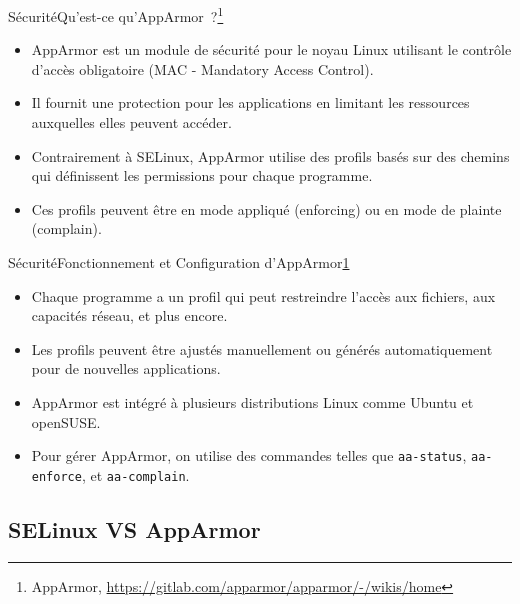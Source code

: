 \documentclass{beamer}
\begin{document}
    \begin{frame}{Sécurité}{Qu'est-ce qu'AppArmor~?\footnote{\label{apparmor}AppArmor, \url{https://gitlab.com/apparmor/apparmor/-/wikis/home}}}
        \begin{itemize}
            \item AppArmor est un module de sécurité pour le noyau Linux utilisant le contrôle d'accès obligatoire (MAC - Mandatory Access Control).
            \item Il fournit une protection pour les applications en limitant les ressources auxquelles elles peuvent accéder.
            \item Contrairement à SELinux, AppArmor utilise des profils basés sur des chemins qui définissent les permissions pour chaque programme.
            \item Ces profils peuvent être en mode appliqué (enforcing) ou en mode de plainte (complain).
        \end{itemize}
    \end{frame}

    \begin{frame}{Sécurité}{Fonctionnement et Configuration d'AppArmor\cref{apparmor}}
        \begin{itemize}
            \item Chaque programme a un profil qui peut restreindre l'accès aux fichiers, aux capacités réseau, et plus encore.
            \item Les profils peuvent être ajustés manuellement ou générés automatiquement pour de nouvelles applications.
            \item AppArmor est intégré à plusieurs distributions Linux comme Ubuntu et openSUSE.
            \item Pour gérer AppArmor, on utilise des commandes telles que \lstinline{aa-status}, \lstinline{aa-enforce}, et \lstinline{aa-complain}.
        \end{itemize}
    \end{frame}

    \subsection{SELinux VS AppArmor}\label{subsec:selinux-vs-apparmor}
\end{document}
